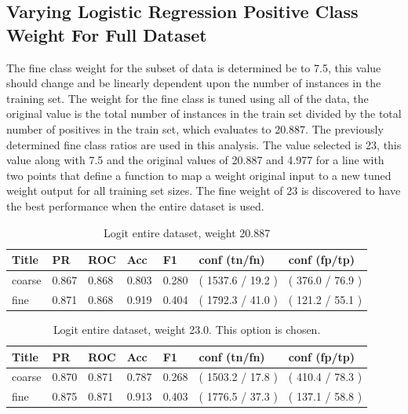 \documentclass[ms]{nuthesis}
\begin{document}
\subsection{Varying Logistic Regression Positive Class Weight For Full Dataset}
\par The fine class weight for the subset of data is determined be to 7.5, this value
should change and be linearly dependent upon the number of instances in the training set.
The weight for the fine class is tuned using all of the data, the original value is the total number
of instances in the train set divided by the total number of positives in the train set, which evaluates
to 20.887. The previously determined fine class ratios are used in this analysis. The value selected is
23, this value along with 7.5 and the original values of 20.887 and 4.977 for a line with two points that
define a function to map a weight original input to a new tuned weight output for all training set sizes.
The fine weight of 23 is discovered to have the best performance when the entire dataset is used.

\FloatBarrier
\begin{table}[H]
\centering
\caption{Logit entire dataset, weight 20.887}
\label{tab:LogRegAllOrig-Wt20p887}
\begin{tabular}{|l||l||l||l||l||l||l|}\toprule
Title & PR & ROC & Acc & F1 & conf (tn/fn) & conf (fp/tp) \\ \midrule
coarse & 0.867 & 0.868 & 0.803 & 0.280 & ( 1537.6 / 19.2 ) & ( 376.0 / 76.9 ) \\
fine & 0.871 & 0.868 & 0.919 & 0.404 & ( 1792.3 / 41.0 ) & ( 121.2 / 55.1 ) \\ \bottomrule
\end{tabular}
\end{table}
\FloatBarrier

\FloatBarrier
\begin{table}[H]
\centering
\caption{Logit entire dataset, weight 23.0. This option is chosen.}
\label{tab:LogRegAll-Wt23}
\begin{tabular}{|l||l||l||l||l||l||l|}\toprule
Title & PR & ROC & Acc & F1 & conf (tn/fn) & conf (fp/tp) \\ \midrule
coarse & 0.870 & 0.871 & 0.787 & 0.268 & ( 1503.2 / 17.8 ) & ( 410.4 / 78.3 ) \\
fine & 0.875 & 0.871 & 0.913 & 0.403 & ( 1776.5 / 37.3 ) & ( 137.1 / 58.8 ) \\ \bottomrule
\end{tabular}
\end{table}
\FloatBarrier
\end{document}
